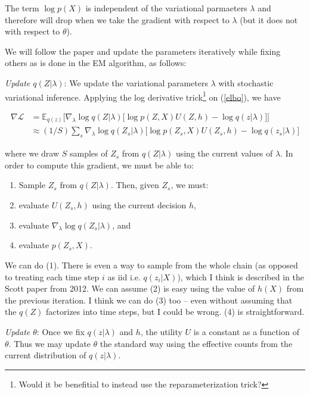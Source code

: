 \documentclass{article}
\begin{document}
The term $\log p(X)$ is independent of the variational parmaeters $\lambda$ and therefore will drop when we take the gradient with respect to $\lambda$ (but it does not with respect to $\theta$).

We will follow the paper and update the parameters iteratively while fixing others as is done in the EM algorithm, as follows:

\textit{Update $q(Z|\lambda)$}: We update the variational parameters $\lambda$ with stochastic variational inference. Applying the log derivative trick\footnote{Would it be benefitial to instead use the reparameterization trick?} on (\ref{elbo}), we have

\begin{align}
\nabla \mathcal{L} &= \mathbb{E}_{q(z)} \Big[ \nabla_{\lambda} \log q(Z|\lambda) \big[ \log p(Z,X) U(Z,h) - \log q(z|\lambda) \big] \Big] \\
                   &\approx (1/S) \sum_s \nabla_{\lambda} \log q(Z_s|\lambda) \big[ \log p(Z_s,X) U(Z_s,h) - \log q(z_s|\lambda) \big]
\end{align}

where we draw $S$ samples of $Z_s$ from $q(Z|\lambda)$ using the current values of $\lambda$. In order to compute this gradient, we must be able to:

\begin{enumerate}
    \item Sample $Z_s$ from $q(Z|\lambda)$. Then, given $Z_s$, we must:
    \item evaluate $U(Z_s, h)$ using the current decision $h$,
    \item evaluate $\nabla_{\lambda} \log q(Z_s|\lambda)$, and
    \item evaluate $p(Z_s,X)$.
\end{enumerate}

We can do (1). There is even a way to sample from the whole chain (as opposed to treating each time step $i$ as iid i.e. $q(z_i|X)$), which I think is described in the Scott paper from 2012. We can assume (2) is easy using the value of $h(X)$ from the previous iteration. I think we can do (3) too -- even without assuming that the $q(Z)$ factorizes into time steps, but I could be wrong. (4) is straightforward.

\textit{Update $\theta$}: Once we fix $q(z|\lambda)$ and $h$, the utility $U$ is a constant as a function of $\theta$. Thus we may update $\theta$ the standard way using the effective counts from the current distribution of $q(z|\lambda)$.
\end{document}

